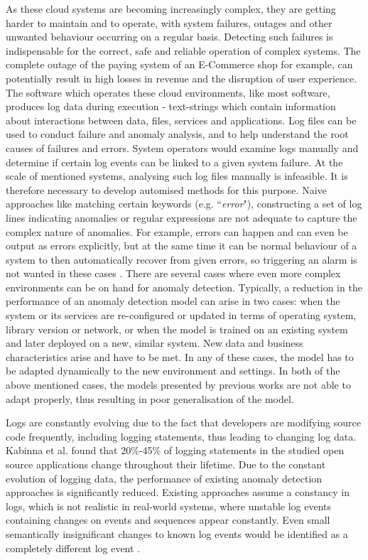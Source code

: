 As these cloud systems are becoming increasingly complex, they are getting harder to maintain and to operate, with system failures, outages and other unwanted behaviour occurring on a regular basis. Detecting such failures is indispensable for the correct, safe and reliable operation of complex systems. The complete outage of the paying system of an E-Commerce shop for example, can potentially result in high losses in revenue and the disruption of user experience. The software which operates these cloud environments, like most software, produces log data during execution - text-strings which contain information about interactions between data, files, services and applications. Log files can be used to conduct failure and anomaly analysis, and to help understand the root causes of failures and errors. System operators would examine logs manually and determine if certain log events can be linked to a given system failure. At the scale of mentioned systems, analysing such log files manually is infeasible. It is therefore necessary to develop automised methods for this purpose. Naive approaches like matching certain keywords (e.g. ``\textit{error}"), constructing a set of log lines indicating anomalies or regular expressions are not adequate to capture the complex nature of anomalies. For example, errors can happen and can even be output as errors explicitly, but at the same time it can be normal behaviour of a system to then automatically recover from given errors, so triggering an alarm is not wanted in these cases \cite{meng2019loganomaly}. 
There are several cases where even more complex environments can be on hand for anomaly detection. Typically, a reduction in the performance of an anomaly detection model can arise in two cases: when the system or its services are re-configured or updated in terms of operating system, library version or network, or when the model is trained on an existing system and later deployed on a new, similar system. New data and business characteristics arise and have to be met. In any of these cases, the model has to be adapted dynamically to the new environment and settings. In both of the above mentioned cases, the models presented by previous works are not able to adapt properly, thus resulting in poor generalisation of the model.

Logs are constantly evolving due to the fact that developers are modifying source code frequently, including logging statements, thus leading to changing log data. Kabinna et al. \cite{kabinna2018examining} found that 20\%-45\% of logging statements in the studied open source applications change throughout their lifetime. Due to the constant evolution of logging data, the performance of existing anomaly detection approaches is significantly reduced. Existing approaches assume a constancy in logs, which is not realistic in real-world systems, where unstable log events containing changes on events and sequences appear constantly. Even small semantically insignificant changes to known log events would be identified as a completely different log event \cite{du2017deeplog} \cite{meng2019loganomaly} \cite{zhang2016automated}. 

